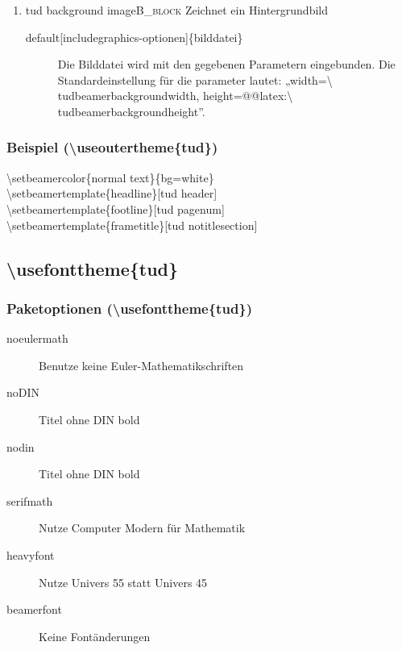 \documentclass[presentation,t]{beamer}
\begin{document}
\begin{enumerate}
\item tud background image\hfill{}\textsc{B\_block}
\label{sec:org5514769}
Zeichnet ein Hintergrundbild

\begin{description}
\item[{default[includegraphics-optionen]\{bilddatei\}}] Die Bilddatei wird
mit den gegebenen Parametern eingebunden. Die Standardeinstellung
für die parameter lautet: „width=\textbackslash
     tudbeamerbackgroundwidth, height=@@latex:\textbackslash
tudbeamerbackgroundheight”.
\end{description}
\end{enumerate}


\subsubsection{Beispiel (\textbackslash useoutertheme\{tud\})}
\label{sec:org6c0505d}

\textbackslash setbeamercolor\{normal text\}\{bg=white\}\\
\textbackslash setbeamertemplate\{headline\}[tud header]\\
\textbackslash setbeamertemplate\{footline\}[tud pagenum]\\
\textbackslash setbeamertemplate\{frametitle\}[tud notitlesection]\\


\subsection{\textbackslash usefonttheme\{tud\}}
\label{sec:orgefdd83a}

\subsubsection{Paketoptionen (\textbackslash usefonttheme\{tud\})}
\label{sec:orgf66c027}
\begin{description}
\item[{noeulermath}] Benutze keine Euler-Mathematikschriften
\item[{noDIN}] Titel ohne DIN bold
\item[{nodin}] Titel ohne DIN bold
\item[{serifmath}] Nutze Computer Modern für Mathematik
\item[{heavyfont}] Nutze Univers 55 statt Univers 45
\item[{beamerfont}] Keine Fontänderungen
\end{description}
\end{document}
